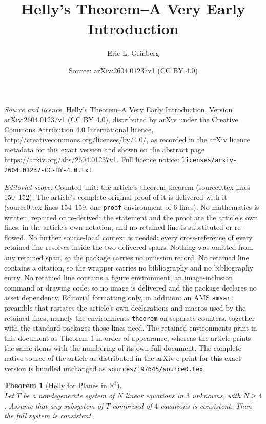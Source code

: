 \documentclass[10pt,a4paper]{amsart}
\title{Helly's Theorem--A Very Early Introduction}
\author{Eric L. Grinberg}
\date{Source: arXiv:2604.01237v1 (CC BY 4.0)}
\newtheorem{theorem}{Theorem}
\begin{document}
\maketitle

\noindent\emph{Source and licence.} Helly's Theorem--A Very Early Introduction. Version arXiv:2604.01237v1 (CC BY 4.0), distributed by arXiv under the Creative Commons Attribution 4.0 International licence, http://creativecommons.org/licenses/by/4.0/, as recorded in the arXiv licence metadata for this exact version and shown on the abstract page https://arxiv.org/abs/2604.01237v1. Full licence notice: \texttt{licenses/arxiv-2604.01237-CC-BY-4.0.txt}.\par\smallskip

\noindent\textit{Editorial scope.} Counted unit: the article's theorem theorem (source0.tex lines 150--152). The article's complete original proof of it is delivered with it (source0.tex lines 154--159, one \texttt{proof} environment of 6 lines). No mathematics is written, repaired or re-derived: the statement and the proof are the article's own lines, in the article's own notation, and no retained line is substituted or re-flowed.  No further source-local context is needed: every cross-reference of every retained line resolves inside the two delivered spans.  Nothing was omitted from any retained span, so the package carries no omission record.  No retained line contains a citation, so the wrapper carries no bibliography and no bibliography entry.  No retained line contains a figure environment, an image-inclusion command or drawing code, so no image is delivered and the package declares no asset dependency.  Editorial formatting only, in addition: an AMS \texttt{amsart} preamble that restates the article's own declarations and macros used by the retained lines, namely the environments \texttt{theorem} on separate counters, together with the standard packages those lines need.  The retained environments print in this document as Theorem 1 in order of appearance, whereas the article prints the same items with the numbering of its own full document.  The complete native source of the article as distributed in the arXiv e-print for this exact version is bundled unchanged as \texttt{sources/197645/source0.tex}.
\begin{theorem}[Helly for Planes in $\mathbb R^3$] \, \\
Let $T$ be a nondegenerate  system of $N$ linear equations in $3$ unknowns, with $N \ge 4$. Assume that any subsystem of $T$ comprised of $4$ equations is consistent. Then the full system is consistent.
\end{theorem}
\end{document}

